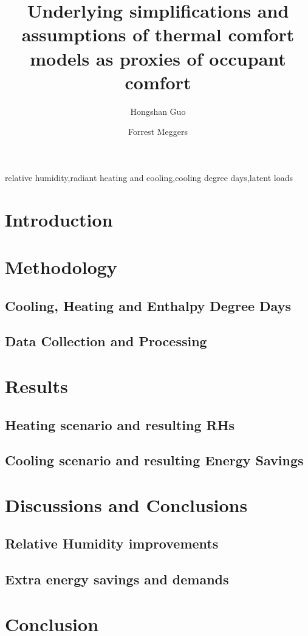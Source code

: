 \documentclass[review]{elsarticle}
\begin{document}
\begin{frontmatter}
\title{Underlying simplifications and assumptions of thermal comfort models as proxies of occupant comfort}
\author[mysecondaryaddress]{Hongshan Guo}
\author[mymainaddress,mysecondaryaddress]{Forrest Meggers}
\address[mymainaddress]{School of Architecture, Princeton University, USA}
\address[mysecondaryaddress]{Andlinger Center for Energy and the Environment, Princeton University, USA.}
\begin{abstract}

\end{abstract}
\begin{keyword}relative humidity\sep radiant heating and cooling\sep cooling degree days\sep latent loads\end{keyword}\end{frontmatter}
\tableofcontents
\section{Introduction}

\section{Methodology}
    \subsection{Cooling, Heating and Enthalpy Degree Days}
        
    \subsection{Data Collection and Processing}
        
\section{Results}
    \subsection{Heating scenario and resulting RHs}
    
    \subsection{Cooling scenario and resulting Energy Savings}
    
\section{Discussions and Conclusions}
    \subsection{Relative Humidity improvements}
    
    \subsection{Extra energy savings and demands}
    
\section{Conclusion}


\end{document}
